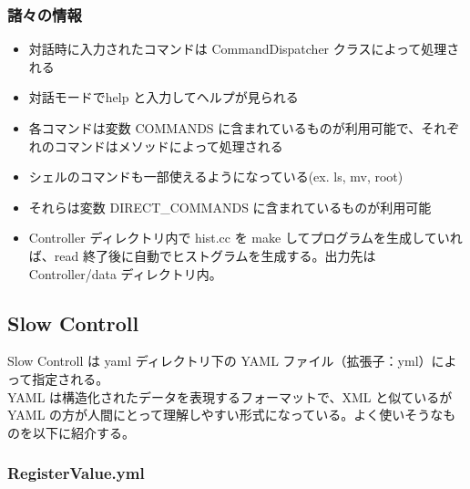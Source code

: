 \documentclass[a4paper]{report}
\begin{document}
\subsubsection{諸々の情報}
\begin{itemize}
\item 対話時に入力されたコマンドは CommandDispatcher クラスによって処理される
\item 対話モードでhelp と入力してヘルプが見られる
\item 各コマンドは変数 COMMANDS に含まれているものが利用可能で、それぞれのコマンドはメソッドによって処理される
\item シェルのコマンドも一部使えるようになっている(ex. ls, mv, root)
\item それらは変数 DIRECT\_COMMANDS に含まれているものが利用可能
\item Controller ディレクトリ内で hist.cc を make してプログラムを生成していれば、read 終了後に自動でヒストグラムを生成する。出力先は Controller/data ディレクトリ内。
\end{itemize}

\newpage
\subsection{Slow Controll}
Slow Controll は yaml ディレクトリ下の YAML ファイル（拡張子：yml）によって指定される。\\
YAML は構造化されたデータを表現するフォーマットで、XML と似ているが YAML の方が人間にとって理解しやすい形式になっている。よく使いそうなものを以下に紹介する。

\subsubsection{RegisterValue.yml}
\end{document}
